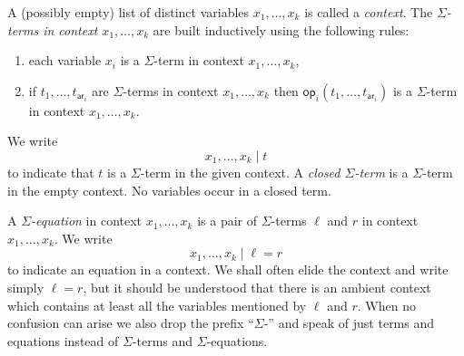 \documentclass{amsart}
\newcommand{\op}[1]{\mathsf{op}_{#1}} %
\newcommand{\arity}[1]{\mathsf{ar}_{#1}} %
\begin{document}
A (possibly empty) list of distinct variables $x_1, \ldots, x_k$ is called a
\emph{context}. The \emph{$\Sigma$-terms in context $x_1, \ldots, x_k$} are
built inductively using the following rules:
% 
\begin{enumerate}
\item each variable $x_i$ is a $\Sigma$-term in context $x_1, \ldots, x_k$,
\item if $t_1, \ldots, t_{\arity{i}}$ are $\Sigma$-terms in context $x_1, \ldots, x_k$ then
  $\op{i}(t_1, \ldots, t_{\arity{i}})$ is a $\Sigma$-term in context $x_1, \ldots, x_k$.
\end{enumerate}
%
We write
%
\begin{equation*}
  x_1, \ldots, x_k \mid t
\end{equation*}
%
to indicate that $t$ is a $\Sigma$-term in the given context. A \emph{closed
  $\Sigma$-term} is a $\Sigma$-term in the empty context. No variables occur
in a closed term.

A \emph{$\Sigma$-equation} in context $x_1, \ldots, x_k$ is a pair of $\Sigma$-terms
$\ell$ and $r$ in context $x_1, \ldots, x_k$. We write
%
\begin{equation*}
  x_1, \ldots, x_k \mid \ell = r
\end{equation*}
%
to indicate an equation in a context. We shall often elide the context and write simply
$\ell = r$, but it should be understood that there is an ambient context which contains at
least all the variables mentioned by $\ell$ and $r$. When no confusion can arise we also
drop the prefix ``$\Sigma$-'' and speak of just terms and equations instead of
$\Sigma$-terms and $\Sigma$-equations.
\end{document}
